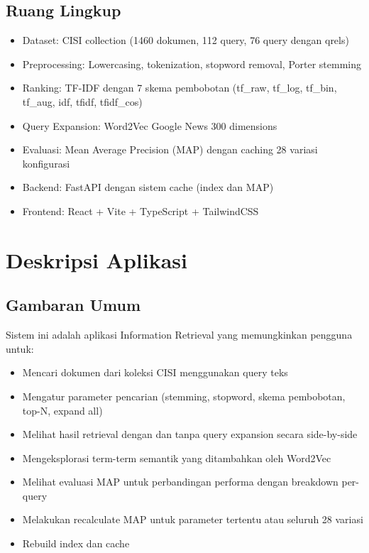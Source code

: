 \documentclass[12pt,a4paper]{report}
\begin{document}
\section{Ruang Lingkup}
\begin{itemize}
    \item Dataset: CISI collection (1460 dokumen, 112 query, 76 query dengan qrels)
    \item Preprocessing: Lowercasing, tokenization, stopword removal, Porter stemming
    \item Ranking: TF-IDF dengan 7 skema pembobotan (tf\_raw, tf\_log, tf\_bin, tf\_aug, idf, tfidf, tfidf\_cos)
    \item Query Expansion: Word2Vec Google News 300 dimensions
    \item Evaluasi: Mean Average Precision (MAP) dengan caching 28 variasi konfigurasi
    \item Backend: FastAPI dengan sistem cache (index dan MAP)
    \item Frontend: React + Vite + TypeScript + TailwindCSS
\end{itemize}

\chapter{Deskripsi Aplikasi}

\section{Gambaran Umum}
Sistem ini adalah aplikasi Information Retrieval yang memungkinkan pengguna untuk:
\begin{itemize}
    \item Mencari dokumen dari koleksi CISI menggunakan query teks
    \item Mengatur parameter pencarian (stemming, stopword, skema pembobotan, top-N, expand all)
    \item Melihat hasil retrieval dengan dan tanpa query expansion secara side-by-side
    \item Mengeksplorasi term-term semantik yang ditambahkan oleh Word2Vec
    \item Melihat evaluasi MAP untuk perbandingan performa dengan breakdown per-query
    \item Melakukan recalculate MAP untuk parameter tertentu atau seluruh 28 variasi
    \item Rebuild index dan cache
\end{itemize}
\end{document}

